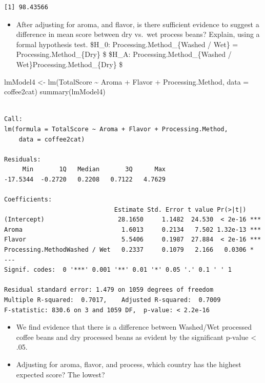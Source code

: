 \documentclass[
  letterpaper,
  DIV=11,
  numbers=noendperiod]{scrreprt}
\newenvironment{Shaded}{\begin{snugshade}}{\end{snugshade}}
\newcommand{\AttributeTok}[1]{\textcolor[rgb]{0.40,0.45,0.13}{#1}}
\newcommand{\FunctionTok}[1]{\textcolor[rgb]{0.28,0.35,0.67}{#1}}
\newcommand{\NormalTok}[1]{\textcolor[rgb]{0.00,0.23,0.31}{#1}}
\newcommand{\OtherTok}[1]{\textcolor[rgb]{0.00,0.23,0.31}{#1}}
\newcommand{\SpecialCharTok}[1]{\textcolor[rgb]{0.37,0.37,0.37}{#1}}
\providecommand{\tightlist}{%
  \setlength{\itemsep}{0pt}\setlength{\parskip}{0pt}}\usepackage{longtable,booktabs,array}
\begin{document}
\begin{verbatim}
[1] 98.43566
\end{verbatim}

\begin{itemize}
\tightlist
\item
  After adjusting for aroma, and flavor, is there sufficient evidence to
  suggest a difference in mean score between dry vs.~wet process beans?
  Explain, using a formal hypothesis test. \$H\_0:
  Processing.Method\_\{Washed / Wet\} = Processing.Method\_\{Dry\} \$
  \$H\_A: Processing.Method\_\{Washed /
  Wet\}\neq Processing.Method\_\{Dry\} \$
\end{itemize}

\begin{Shaded}
\begin{Highlighting}[]
\NormalTok{lmModel4 }\OtherTok{\textless{}{-}} \FunctionTok{lm}\NormalTok{(TotalScore }\SpecialCharTok{\textasciitilde{}}\NormalTok{ Aroma }\SpecialCharTok{+}\NormalTok{ Flavor }\SpecialCharTok{+}\NormalTok{ Processing.Method, }\AttributeTok{data =}\NormalTok{ coffee2cat)}
\FunctionTok{summary}\NormalTok{(lmModel4)}
\end{Highlighting}
\end{Shaded}

\begin{verbatim}

Call:
lm(formula = TotalScore ~ Aroma + Flavor + Processing.Method, 
    data = coffee2cat)

Residuals:
     Min       1Q   Median       3Q      Max 
-17.5344  -0.2720   0.2208   0.7122   4.7629 

Coefficients:
                              Estimate Std. Error t value Pr(>|t|)    
(Intercept)                    28.1650     1.1482  24.530  < 2e-16 ***
Aroma                           1.6013     0.2134   7.502 1.32e-13 ***
Flavor                          5.5406     0.1987  27.884  < 2e-16 ***
Processing.MethodWashed / Wet   0.2337     0.1079   2.166   0.0306 *  
---
Signif. codes:  0 '***' 0.001 '**' 0.01 '*' 0.05 '.' 0.1 ' ' 1

Residual standard error: 1.479 on 1059 degrees of freedom
Multiple R-squared:  0.7017,    Adjusted R-squared:  0.7009 
F-statistic: 830.6 on 3 and 1059 DF,  p-value: < 2.2e-16
\end{verbatim}

\begin{itemize}
\item
  We find evidence that there is a difference between Washed/Wet
  processed coffee beans and dry processed beans as evident by the
  significant p-value \textless{} .05.
\item
  Adjusting for aroma, flavor, and process, which country has the
  highest expected score? The lowest?
\end{itemize}
\end{document}
